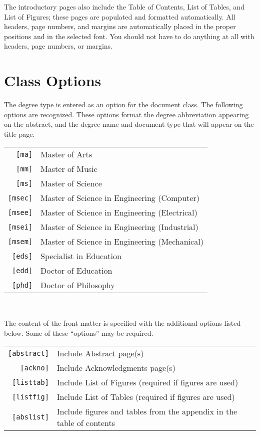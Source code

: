 \documentclass{wmu-thesis}
\begin{document}
The introductory pages also include the Table of Contents, List of Tables, and List of Figures; these pages are populated and formatted automatically.  All headers, page numbers, and margins are automatically placed in the proper positions and in the selected font.  You should not have to do anything at all with headers, page numbers, or margins.

\section*{Class Options}
The degree type is entered as an option for the document class.  The following options are recognized.  These options format the degree abbreviation appearing on the abstract, and the degree name and document type that will appear on the title page.\\
\begin{center}
\begin{tabular}{rl}
\texttt{[ma]}   &Master of Arts\\
\texttt{[mm]}   &Master of Music\\
\texttt{[ms]}   &Master of Science\\
\texttt{[msec]} &Master of Science in Engineering (Computer)\\
\texttt{[msee]} &Master of Science in Engineering (Electrical)\\
\texttt{[msei]} &Master of Science in Engineering (Industrial)\\
\texttt{[msem]} &Master of Science in Engineering (Mechanical)\\
\texttt{[eds]}  &Specialist in Education\\
\texttt{[edd]}  &Doctor of Education\\
\texttt{[phd]}  &Doctor of Philosophy\\
\end{tabular}\\
\end{center}

The content of the front matter is specified with the additional options listed below.  Some of these ``options'' may be required.\\
\begin{center}
\begin{tabular}{rl}
\texttt{[abstract]} &Include Abstract page(s)\\
\texttt{[ackno]}    &Include Acknowledgments page(s)\\
\texttt{[listtab]}  &Include List of Figures (required if figures are used)\\
\texttt{[listfig]}  &Include List of Tables (required if figures are used)\\
\texttt{[abslist]}  &Include figures and tables from the appendix in the table of contents\\
\end{tabular}\\
\end{center}
\end{document}
